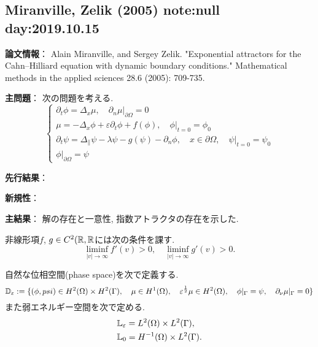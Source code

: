 \documentclass[a4paper]{jsarticle}
\begin{document}
\newpage

\subsection{Miranville, Zelik (2005) \cite{MiranvilleZelik2005} note:null  day:2019.10.15}
{\bf 論文情報}：
Alain Miranville, and Sergey Zelik. "Exponential attractors for the Cahn–Hilliard equation with dynamic boundary conditions." Mathematical methods in the applied sciences 28.6 (2005): 709-735.

{\bf 主問題}：
次の問題を考える.
\begin{equation}\left\{\begin{array}{l}
	{\partial_{t} \phi=\Delta_{x} \mu,\left.\quad \partial_{n} \mu\right|_{\partial \Omega}=0} \\ {\mu=-\Delta_{x} \phi+\varepsilon \partial_{t} \phi+f(\phi),\left.\quad \phi\right|_{t=0}=\phi_{0}} \\ {\partial_{t} \psi=\Delta_{\|} \psi-\lambda \psi-g(\psi)-\partial_{n} \phi, \quad x \in \partial \Omega,\left.\quad \psi\right|_{t=0}=\psi_{0}} \\ {\left.\phi\right|_{\partial \Omega}=\psi}
\end{array}\right.\end{equation}

{\bf 先行結果}：

{\bf 新規性}：

{\bf 主結果}：
解の存在と一意性, 指数アトラクタの存在を示した.

非線形項$f$, $g\in C^2(\mathbb{R},\mathbb{R}$には次の条件を課す.
\begin{equation}
\liminf_{|v|\to\infty}f'(v)>0,\quad \liminf_{|v|\to\infty}g'(v)>0.
\end{equation}

自然な位相空間(phase space)を次で定義する.
\begin{equation}
\mathbb{D}_{\varepsilon} := \{(\phi,psi)\in H^2(\Omega)\times H^2(\Gamma),\quad \mu\in H^1(\Omega),\quad \varepsilon^{\frac{1}{2}}\mu\in H^2(\Omega),\quad \phi|_{\Gamma}=\psi,\quad \partial_{\nu}\mu|_{\Gamma}=0\}
\end{equation}
また弱エネルギー空間を次で定める.
\begin{align}
&\mathbb{L}_{\varepsilon} = L^2(\Omega)\times L^2(\Gamma),\\
&\mathbb{L}_0 = H^{-1}(\Omega)\times L^2(\Gamma).
\end{align}
\end{document}
